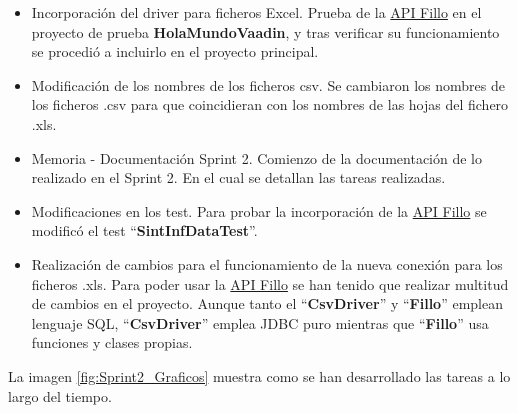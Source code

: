 \begin{itemize}
	\item Incorporación del driver para ficheros Excel. 
		Prueba de la \href{https://codoid.com/fillo/}{API Fillo} en el proyecto de prueba \textbf{HolaMundoVaadin}, y tras verificar su funcionamiento se procedió a incluirlo en el proyecto principal.
	\item Modificación de los nombres de los ficheros csv. 
		Se cambiaron los nombres de los ficheros .csv para que coincidieran con los nombres de las hojas del fichero .xls. 
	\item Memoria - Documentación Sprint 2. 
		Comienzo de la documentación de lo realizado en el Sprint 2. En el cual se detallan las tareas realizadas.
	\item Modificaciones en los test. 
		Para probar la incorporación de la \href{https://codoid.com/fillo/}{API Fillo} se modificó el test  ``\textbf{\textbf{SintInfDataTest}}''.
	\item Realización de cambios para el funcionamiento de la nueva conexión para los ficheros .xls. 
		Para poder usar la \href{https://codoid.com/fillo/}{API Fillo} se han tenido que realizar multitud de cambios en el proyecto. Aunque tanto el ``\textbf{\textbf{CsvDriver}}'' y ``\textbf{\textbf{Fillo}}'' emplean lenguaje SQL, ``\textbf{CsvDriver}'' emplea JDBC puro mientras que ``\textbf{Fillo}'' usa funciones y clases propias.
\end{itemize}

La imagen \ref{fig:Sprint2_Graficos} muestra como se han desarrollado las tareas a lo largo del tiempo.


